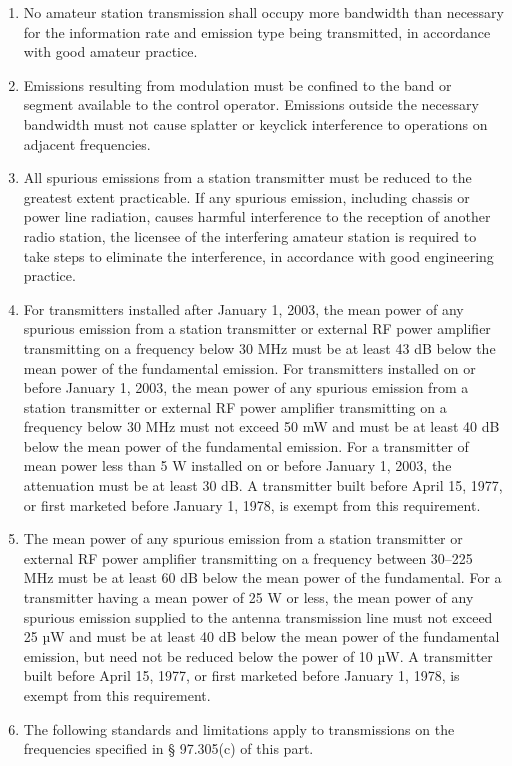 \documentclass[
  letterpaper,
  DIV=11,
  numbers=noendperiod]{scrreport}
\begin{document}
\begin{enumerate}
\def\labelenumi{(\alph{enumi})}
\item
  No amateur station transmission shall occupy more bandwidth than
  necessary for the information rate and emission type being
  transmitted, in accordance with good amateur practice.
\item
  Emissions resulting from modulation must be confined to the band or
  segment available to the control operator. Emissions outside the
  necessary bandwidth must not cause splatter or keyclick interference
  to operations on adjacent frequencies.
\item
  All spurious emissions from a station transmitter must be reduced to
  the greatest extent practicable. If any spurious emission, including
  chassis or power line radiation, causes harmful interference to the
  reception of another radio station, the licensee of the interfering
  amateur station is required to take steps to eliminate the
  interference, in accordance with good engineering practice.
\item
  For transmitters installed after January 1, 2003, the mean power of
  any spurious emission from a station transmitter or external RF power
  amplifier transmitting on a frequency below 30 MHz must be at least 43
  dB below the mean power of the fundamental emission. For transmitters
  installed on or before January 1, 2003, the mean power of any spurious
  emission from a station transmitter or external RF power amplifier
  transmitting on a frequency below 30 MHz must not exceed 50 mW and
  must be at least 40 dB below the mean power of the fundamental
  emission. For a transmitter of mean power less than 5 W installed on
  or before January 1, 2003, the attenuation must be at least 30 dB. A
  transmitter built before April 15, 1977, or first marketed before
  January 1, 1978, is exempt from this requirement.
\item
  The mean power of any spurious emission from a station transmitter or
  external RF power amplifier transmitting on a frequency between
  30--225 MHz must be at least 60 dB below the mean power of the
  fundamental. For a transmitter having a mean power of 25 W or less,
  the mean power of any spurious emission supplied to the antenna
  transmission line must not exceed 25 µW and must be at least 40 dB
  below the mean power of the fundamental emission, but need not be
  reduced below the power of 10 µW. A transmitter built before April 15,
  1977, or first marketed before January 1, 1978, is exempt from this
  requirement.
\item
  The following standards and limitations apply to transmissions on the
  frequencies specified in § 97.305(c) of this part.
\end{enumerate}
\end{document}
